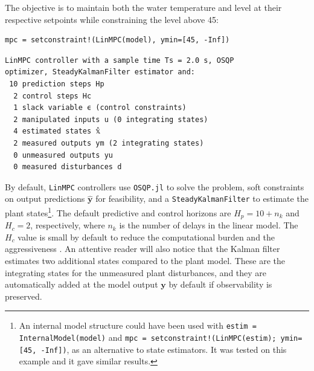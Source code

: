 The objective is to maintain both the water temperature and level at their respective setpoints while constraining the level above 45:
\begin{verbatim}
mpc = setconstraint!(LinMPC(model), ymin=[45, -Inf])
\end{verbatim}
\spacerepl
\begin{verbatim}
LinMPC controller with a sample time Ts = 2.0 s, OSQP
optimizer, SteadyKalmanFilter estimator and:
 10 prediction steps Hp
  2 control steps Hc
  1 slack variable ϵ (control constraints)
  2 manipulated inputs u (0 integrating states)
  4 estimated states 𝕩̂
  2 measured outputs ym (2 integrating states)
  0 unmeasured outputs yu
  0 measured disturbances d
\end{verbatim}
By default, \texttt{LinMPC} controllers use \texttt{OSQP.jl} \citep{osqp} to solve the problem, soft constraints on output predictions $\mathbf{\hat y}$ for feasibility, and a \texttt{SteadyKalmanFilter} to estimate the plant states\footnote{An internal model structure could have been used with \texttt{estim = InternalModel(model)} and \texttt{mpc = setconstraint!(LinMPC(estim); ymin=[45, -Inf])}, as an alternative to state estimators. It was tested on this example and it gave similar results.}. The default predictive and control horizons are $H_p = 10 + n_k$ and $H_c = 2$, respectively, where $n_k$ is the number of delays in the linear model. The $H_c$ value is small by default to reduce the computational burden and the aggressiveness \citep{mpcHcAnalysis}. An attentive reader will also notice that the Kalman filter estimates two additional states compared to the plant model. These are the integrating states for the unmeasured plant disturbances, and they are automatically added at the model output $\mathbf{y}$ by default if observability is preserved.

